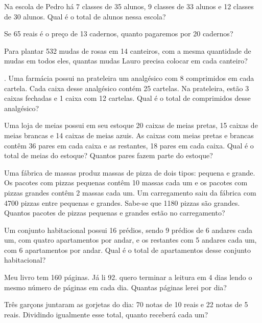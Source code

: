 	\item Na escola de Pedro há 7 classes de 35 alunos, 9 classes de 33 alunos e 12 classes de 30 alunos. Qual é o total de alunos nessa escola?
	
	\item Se 65 reais é o preço de 13 cadernos, quanto pagaremos por 20 cadernos?
	
	\item Para plantar 532 mudas de rosas em 14 canteiros, com a mesma quantidade de mudas em todos eles, quantas mudas Lauro precisa colocar em cada canteiro?
	
	\item . Uma farmácia possui na prateleira um analgésico com 8 comprimidos em cada cartela. Cada caixa desse analgésico contém 25 cartelas. Na prateleira, estão 3 caixas fechadas e 1 caixa com 12 cartelas. Qual é o total de comprimidos desse analgésico?
	
	\item  Uma loja de meias possui em seu estoque 20 caixas de meias pretas, 15 caixas de meias brancas e 14 caixas de meias azuis. As caixas com meias pretas e brancas contêm 36 pares em cada caixa e as restantes, 18 pares em cada caixa. Qual é o total de meias do estoque? Quantos pares fazem parte do estoque?
	
	\item Uma fábrica de massas produz massas de pizza de dois tipos: pequena e grande. Os pacotes com pizzas pequenas contêm 10 massas cada um e os pacotes com pizzas grandes contêm 2 massas cada um. Um carregamento saiu da fábrica com 4700 pizzas entre pequenas e grandes. Sabe-se que 1180 pizzas são grandes. Quantos pacotes de pizzas pequenas e grandes estão no carregamento?
	
	\item Um conjunto habitacional possui 16 prédios, sendo 9 prédios de 6 andares cada um, com quatro apartamentos por andar, e os restantes com 5 andares cada um, com 6 apartamentos por andar. Qual é o total de apartamentos desse conjunto habitacional?
	
	\item Meu livro tem 160 páginas. Já li 92. quero terminar a leitura em 4 dias lendo o mesmo número de páginas em cada dia. Quantas páginas lerei por dia?
	
	\item Três garçons juntaram as gorjetas do dia: 70 notas de 10 reais e 22 notas de 5 reais. Dividindo igualmente esse total, quanto receberá cada um?
	
